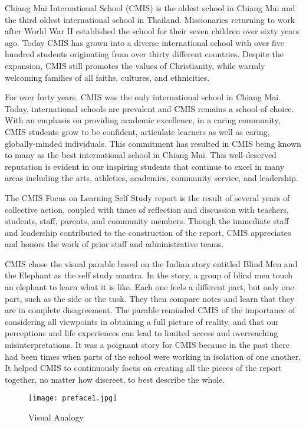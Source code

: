 Chiang Mai International School (CMIS) is the oldest school in Chiang Mai and the third oldest international school in Thailand. Missionaries returning to work after World War II established the school for their seven children over sixty years ago. Today CMIS has grown into a diverse international school with over five hundred students originating from over thirty different countries. Despite the expansion, CMIS still promotes the values of Christianity, while warmly welcoming families of all faiths, cultures, and ethnicities. 

For over forty years, CMIS was the only international school in Chiang Mai. Today, international schools are prevalent and CMIS remains a school of choice. With an emphasis on providing academic excellence, in a caring community, CMIS students grow to be confident, articulate learners as well as caring, globally-minded individuals. This commitment has resulted in CMIS being known to many as the best international school in Chiang Mai. This well-deserved reputation is evident in our inspiring students that continue to excel in many areas including the arts, athletics, academics, community service, and leadership. 

The CMIS Focus on Learning Self Study report is the result of several years of collective action, coupled with times of reflection and discussion with teachers, students, staff, parents, and community members. Though the immediate staff and leadership contributed to the construction of the report, CMIS appreciates and honors the work of prior staff and administrative teams. 

CMIS chose the visual parable based on the Indian story entitled Blind Men and the Elephant as the self study mantra. In the story, a group of blind men touch an elephant to learn what it is like. Each one feels a different part, but only one part, such as the side or the tusk. They then compare notes and learn that they are in complete disagreement. The parable reminded CMIS of the importance of considering all viewpoints in obtaining a full picture of reality, and that our perceptions and life experiences can lead to limited access and overreaching misinterpretations. It was a poignant story for CMIS because in the past there had been times when parts of the school were working in isolation of one another. It helped CMIS to continuously focus on creating all the pieces of the report together, no matter how discreet, to best describe the whole. 


\begin{figure}
\centering
\texttt{[image: preface1.jpg]}
\caption{Visual Analogy}
\end{figure}

